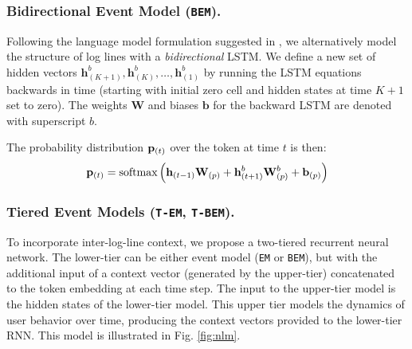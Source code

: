 \documentclass[letterpaper]{article} %
\begin{document}
\subsubsection{Bidirectional Event Model (\texttt{BEM}).}\label{subsec:bidirmodel}
Following the language model formulation suggested in \cite{schuster1997bidirectional}, we alternatively model the structure of log lines with a {\it bidirectional} LSTM.
 We define a new set of hidden vectors $\mathbf{h}^b_{(K+1)}, \mathbf{h}^b_{(K)},\dots,\mathbf{h}^b_{(1)}$ by running the LSTM equations backwards in time (starting with initial zero cell and hidden states at time $K+1$ set to zero).  The weights $\mathbf{W}$ and biases $\mathbf{b}$ for the backward LSTM are denoted with superscript $b$.

 The probability distribution ${\bf p}_{(t)} $ over the token at time $t$ is then:
\begin{equation}
    {\bf p}_{(t)}  = \mbox{softmax}\left({\bf h}_{(t-1)} {\bf W}_{(p)} + {\bf h}^b_{(t+1)} {\bf W}_{(p)}^{b}+ {\bf b}_{(p)}\right)
\end{equation}

\subsubsection{Tiered Event Models (\texttt{T-EM}, \texttt{T-BEM}).}\label{subsec:tieredmodel}
To incorporate inter-log-line context, we propose a two-tiered recurrent neural network.  
The lower-tier can be either event model (\texttt{EM} or \texttt{BEM}), but with the additional input of a context vector (generated by the upper-tier) concatenated to the token embedding at each time step.
The input to the upper-tier model is the hidden states of the lower-tier model.  This upper tier models the dynamics of user behavior over time, producing the context vectors provided to the lower-tier RNN. This model is illustrated in Fig. \ref{fig:nlm}.  
\end{document}

